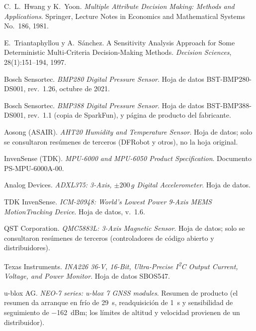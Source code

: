  C.~L.~Hwang y K.~Yoon. \emph{Multiple Attribute Decision Making:
  Methods and Applications}. Springer, Lecture Notes in Economics and Mathematical Systems
  No.~186, 1981.

 E.~Triantaphyllou y A.~Sánchez. A Sensitivity Analysis
  Approach for Some Deterministic Multi-Criteria Decision-Making Methods. \emph{Decision
  Sciences}, 28(1):151--194, 1997.

 Bosch Sensortec. \emph{BMP280 Digital Pressure Sensor}. Hoja de
  datos BST-BMP280-DS001, rev.~1.26, octubre de 2021.

 Bosch Sensortec. \emph{BMP388 Digital Pressure Sensor}. Hoja de
  datos BST-BMP388-DS001, rev.~1.1 (copia de SparkFun), y página de producto del fabricante.

 Aosong (ASAIR). \emph{AHT20 Humidity and Temperature Sensor}. Hoja de
  datos; solo se consultaron resúmenes de terceros (DFRobot y otros), no la hoja original.

 InvenSense (TDK). \emph{MPU-6000 and MPU-6050 Product Specification}.
  Documento PS-MPU-6000A-00.

 Analog Devices. \emph{ADXL375: 3-Axis, $\pm200\,g$ Digital
  Accelerometer}. Hoja de datos.

 TDK InvenSense. \emph{ICM-20948: World's Lowest Power 9-Axis
  MEMS MotionTracking Device}. Hoja de datos, v.~1.6.

 QST Corporation. \emph{QMC5883L: 3-Axis Magnetic Sensor}. Hoja de
  datos; solo se consultaron resúmenes de terceros (controladores de código abierto y
  distribuidores).

 Texas Instruments. \emph{INA226 36-V, 16-Bit, Ultra-Precise
  I\textsuperscript{2}C Output Current, Voltage, and Power Monitor}. Hoja de datos SBOS547.

 u-blox AG. \emph{NEO-7 series: u-blox 7 GNSS modules}. Resumen de
  producto (el resumen da arranque en frío de \SI{29}{s}, readquisición de \SI{1}{s} y
  sensibilidad de seguimiento de \SI{-162}{dBm}; los límites de altitud y velocidad provienen de
  un distribuidor).

